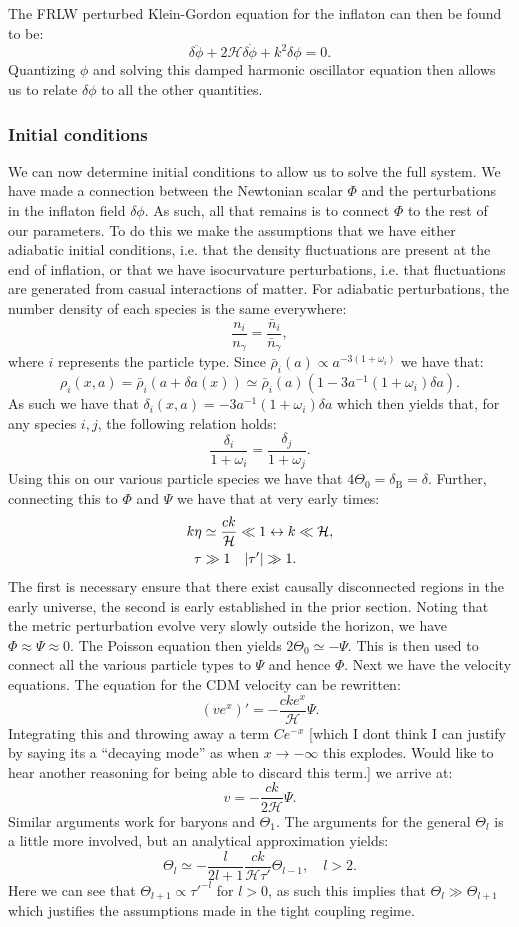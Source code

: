 \documentclass[%
reprint,
 amsmath,amssymb,
 aps,
]{revtex4-2}
\newcommand{\Hp}{\mathcal{H}}
\begin{document}
The FRLW perturbed Klein-Gordon equation for the inflaton can then be found to be:
\[\delta\ddot\phi+2\Hp\delta\dot\phi+k^2\delta\phi=0.\]
Quantizing $\phi$ and solving this damped harmonic oscillator equation then allows us to relate $\delta\phi$ to all the other quantities. 

\subsubsection{Initial conditions}
We can now determine initial conditions to allow us to solve the full system. We have made a connection between the Newtonian scalar $\Phi$ and the perturbations in the inflaton field $\delta\phi$. As such, all that remains is to connect $\Phi$ to the rest of our parameters. To do this we make the assumptions that we have either adiabatic initial conditions, i.e. that the density fluctuations are present at the end of inflation, or that we have isocurvature perturbations, i.e. that fluctuations are generated from casual interactions of matter. For adiabatic perturbations, the number density of each species is the same everywhere:
\[\frac{n_i}{n_\gamma}=\frac{\bar n_i}{\bar n_\gamma},\]
where $i$ represents the particle type. Since $\bar\rho_i(a)\propto a^{-3(1+\omega_i)}$ \cite{Carroll:2004st} we have that:
\[\rho_i(x,a)=\bar\rho_i(a+\delta a(x))\simeq\bar\rho_i(a)(1-3a^{-1}(1+\omega_i)\delta a).\]
As such we have that $\delta_i(x,a)=-3a^{-1}(1+\omega_i)\delta a$ which then yields that, for any species $i,j$, the following relation holds:
\[\frac{\delta_i}{1+\omega_i}=\frac{\delta_j}{1+\omega_j}.\]
Using this on our various particle species we have that $4\Theta_0=\delta_\text{B}=\delta$. Further, connecting this to $\Phi$ and $\Psi$ we have that at very early times:
\begin{align*}
	k\eta&\simeq \frac{ck}{\Hp}\ll1\leftrightarrow k\ll\Hp,\\
	\tau&\gg1\quad\abs{\tau'}\gg1.
\end{align*}
The first is necessary ensure that there exist causally disconnected regions in the early universe, the second is early established in the prior section. Noting that the metric perturbation evolve very slowly outside the horizon, we have $\Phi\approx\Psi\approx0$. The Poisson equation then yields $2\Theta_0\simeq-\Psi$. This is then used to connect all the various particle types to $\Psi$ and hence $\Phi$. Next we have the velocity equations. The equation for the CDM velocity can be rewritten:
\[(ve^x)'=-\frac{cke^x}{\Hp}\Psi.\]
Integrating this and throwing away a term $Ce^{-x}$ \color{red}[which I dont think I can justify by saying its a ``decaying mode'' as when $x\to-\infty$ this explodes. Would like to hear another reasoning for being able to discard this term.] \color{black} we arrive at:
\[v=-\frac{ck}{2\Hp}\Psi.\]
Similar arguments work for baryons and $\Theta_1$. The arguments for the general $\Theta_l$ is a little more involved, but an analytical approximation yields:
\[\Theta_l\simeq-\frac{l}{2l+1}\frac{ck}{\Hp\tau'}\Theta_{l-1},\quad l>2.\]
Here we can see that $\Theta_{l+1}\propto\tau'^{-l}$ for $l>0$, as such this implies that $\Theta_l\gg\Theta_{l+1}$ which justifies the assumptions made in the tight coupling regime. 
\end{document}
